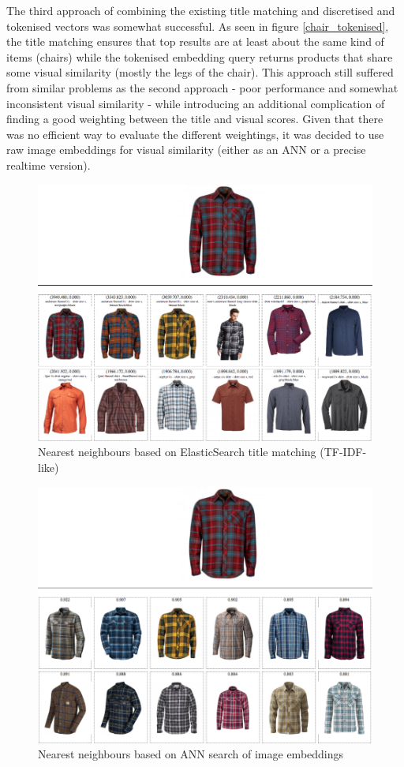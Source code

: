 The third approach of combining the existing title matching and discretised and tokenised vectors was somewhat successful.
As seen in figure \ref{chair_tokenised}, the title matching ensures that top results are at least about the same kind of items (chairs) while the tokenised embedding query returns products that share some visual similarity (mostly the legs of the chair).
This approach still suffered from similar problems as the second approach - poor performance and somewhat inconsistent visual similarity - while introducing an additional complication of finding a good weighting between the title and visual scores.
Given that there was no efficient way to evaluate the different weightings, it was decided to use raw image embeddings for visual similarity (either as an ANN or a precise realtime version).

\begin{figure}
  \centering
  \includegraphics[width=0.8\linewidth]{figures/compare/shirt_es}
  \caption{Nearest neighbours based on ElasticSearch title matching (TF-IDF-like)}
  \label{shirt_es}
\end{figure}
\begin{figure}
  \centering
  \includegraphics[width=0.8\linewidth]{figures/compare/shirt_nmslib}
  \caption{Nearest neighbours based on ANN search of image embeddings}
  \label{shirt_nmslib}
\end{figure}

